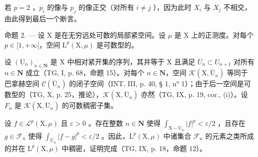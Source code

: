 若 \(p = 2\) ，\(p_i\) 的像与 \(p_j\) 的像正交（对所有 \(i \neq j\) ），因为此时 \(X_i\) 与 \(X_j\) 不相交，由此得到最后一个断言。

命题 2. --- 设 X 是在无穷远处可数的局部紧空间。设 \(\mu\) 是 X 上的正测度。对每个 \(p \in [1, +\infty[\)，空间 \(\mathrm{L}^{p}(\mathrm{X},\mu)\) 是可数型的。

设 \((\mathrm{U}_{n})_{n\in\mathbf{N}}\) 是 X 中相对紧开集的序列，其并等于 X 且满足 \(\overline{U}_{n}\subset U_{n+1}\) 对所有 \(n\in\mathbf{N}\) 成立（TG, I, p. 68，命题 15）。对每个 \(n\in\mathbf{N}\)，空间 \(\mathcal{K}(\mathrm{X},\overline{\mathrm{U}}_{n})\) 等同于巴拿赫空间 \(\mathcal{C}(\overline{\mathrm{U}}_{n})\) 的闭子空间（INT, III, p. 40, § 1, n° 1）；由于后一空间是可数型的（TG, X, p. 25，推论），\(\mathcal{K}(\mathrm{X},\overline{\mathrm{U}}_{n})\) 亦然（TG, IX, p. 19, cor., (i)）。设 \(F_{n}\) 是 \(\mathcal{K}(\mathrm{X},\overline{\mathrm{U}}_{n})\) 的可数稠密子集。

设 \(f \in \mathcal{L}^p(\mathrm{X},\mu)\) 且 \(\varepsilon > 0\) 。存在整数 \(n \in \mathbf{N}\) 使得 \(\int_{\mathrm{X}-\mathrm{U}_n}|f|^p < \varepsilon / 2\) ，且存在 \(g \in \mathcal{F}_n\) 使得 \(\int_{\overline{\mathrm{U}}_n}|f - g|^p < \varepsilon / 2\) 。因此，\(\mathrm{L}^p(\mathrm{X},\mu)\) 中诸集合 \(\mathcal{F}_n\) 的元素之类所成的并在 \(\mathrm{L}^p(\mathrm{X},\mu)\) 中稠密，证明完成（TG, IX, p. 18，命题 12）。


